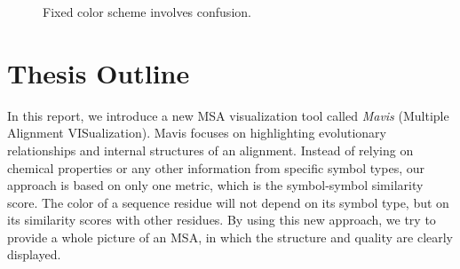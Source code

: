 \begin{figure}[hbt]
\centering
{}
\hspace{5mm}
\caption[Fixed Color Scheme Involves Confusion]{Fixed color scheme involves confusion.}\label{fig:intro1}
\end{figure}

\section{Thesis Outline}

In this report, we introduce a new MSA visualization tool called \emph{Mavis} (Multiple Alignment VISualization). Mavis focuses on highlighting evolutionary relationships and internal structures of an alignment. Instead of relying on chemical properties or any other information from specific symbol types, our approach is based on only one metric, which is the symbol-symbol similarity score. The color of a sequence residue will not depend on its symbol type, but on its similarity scores with other residues. By using this new approach, we try to provide a whole picture of an MSA, in which the structure and quality are clearly displayed.

